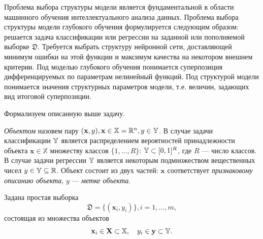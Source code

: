 Проблема  выбора структуры модели является фундаментальной в области машинного обучения интеллектуального анализа данных.
Проблема выбора структуры модели глубокого обучения формулируется следующим образом: решается задача классификации или регрессии на заданной или пополняемой выборке $\mathfrak{D}$. Требуется выбрать структуру нейронной сети, доставляющей минимум ошибки на этой функции и максимум качества на некотором внешнем критерии.
 Под моделью глубокого обучения понимается суперпозиция дифференцируемых по параметрам нелинейный функций. Под структурой модели понимается значения структурных параметров модели, т.е. величин, задающих вид итоговой суперпозиции. 

Формализуем описанную выше задачу.
\begin{defin}
\textit{Объектом} назовем пару $(\mathbf{x}, y), \mathbf{x} \in \mathbb{X} =  \mathbb{R}^n, y \in \mathbb{Y}$. В случае задачи классификации $\mathbb{Y}$ является распределением вероятностей принадлежности объекта $\mathbf{x} \in \mathbb{X}$ множеству классов $\{1, \dots, R\}$: $\mathbb{Y} \subset [0,1]^R$, где $R$ --- число классов. В случае задачи регрессии $\mathbb{Y}$ является некоторым подмножеством вещественных чисел ${y} \in \mathbb{Y}  \subseteq \mathbb{R}$.
Объект состоит из двух частей: $\mathbf{x}$  соответствует \textit{признаковому описанию объекта}, $y$ --- \textit{метке объекта}.
\end{defin}

Задана простая выборка \begin{equation}\label{eq:dataset}\mathfrak{D} = \{(\mathbf{x}_i,y_i)\}, i = 1,\dots,m,\end{equation} состоящая из множества объектов $$\mathbf{x}_i \in \mathbf{X} \subset  \mathbb{X}, \quad {y}_i \in \mathbf{y} \subset \mathbb{Y}.$$ 


